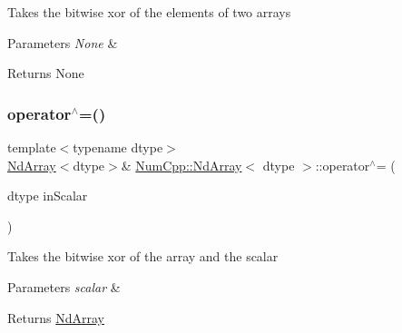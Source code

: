 Takes the bitwise xor of the elements of two arrays


\begin{DoxyParams}{Parameters}
{\em None} & \\
\hline
\end{DoxyParams}
\begin{DoxyReturn}{Returns}
None 
\end{DoxyReturn}
\mbox{\label{class_num_cpp_1_1_nd_array_a956700ddc71d08da7257b3bf78a2bb2b}} 
\subsubsection{\texorpdfstring{operator$^\wedge$=()}{operator^=()}\hspace{0.1cm}{\footnotesize\ttfamily [2/2]}}
{\footnotesize\ttfamily template$<$typename dtype$>$ \\
\mbox{\hyperlink{class_num_cpp_1_1_nd_array}{Nd\+Array}}$<$dtype$>$\& \mbox{\hyperlink{class_num_cpp_1_1_nd_array}{Num\+Cpp\+::\+Nd\+Array}}$<$ dtype $>$\+::operator$^\wedge$= (\begin{DoxyParamCaption}\item[{dtype}]{in\+Scalar }\end{DoxyParamCaption})\hspace{0.3cm}{\ttfamily [inline]}}

Takes the bitwise xor of the array and the scalar


\begin{DoxyParams}{Parameters}
{\em scalar} & \\
\hline
\end{DoxyParams}
\begin{DoxyReturn}{Returns}
\mbox{\hyperlink{class_num_cpp_1_1_nd_array}{Nd\+Array}} 
\end{DoxyReturn}
\mbox{\label{class_num_cpp_1_1_nd_array_a59cb53c065f76dcec0f4022ab011226c}} 
